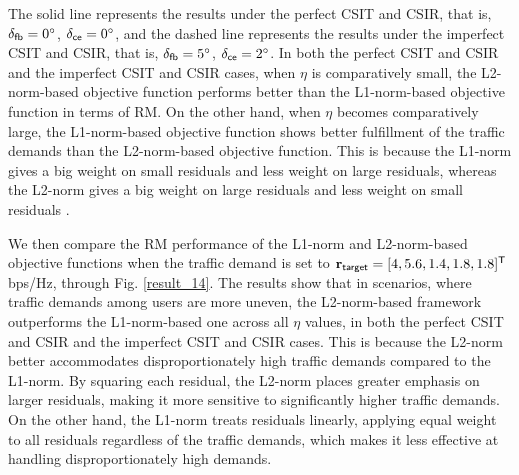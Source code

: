 \documentclass[draftclsnofoot, onecolumn, comsoc, 12pt]{IEEEtran}
\begin{document}
The solid line represents the results under the perfect CSIT and CSIR, that is, $\delta_{\sf{fb}} = 0^{\circ}$, $\delta_{\sf{ce}} = 0^{\circ}$, and the dashed line represents the results under the imperfect CSIT and CSIR, that is, $\delta_{\sf{fb}} = 5^{\circ}$, $\delta_{\sf{ce}} = 2^{\circ}$. In both the perfect CSIT and CSIR and the imperfect CSIT and CSIR cases, when $\eta$ is comparatively small, the L2-norm-based objective function performs better than the L1-norm-based objective function in terms of RM.
On the other hand, when $\eta$ becomes comparatively large, the L1-norm-based objective function shows better fulfillment of the traffic demands than the L2-norm-based objective function.
{This is because the L1-norm gives a big weight on small residuals and less weight on large residuals, whereas the L2-norm gives a big weight on large residuals and less weight on small residuals \cite{boyd2004convex}.}

{ We then compare the RM performance of the L1-norm and L2-norm-based objective functions when the traffic demand is set to $\mathbf{r}_{\sf{target}} = [4, 5.6, 1.4, 1.8, 1.8]^{\sf{T}}$ bps/Hz, through Fig. \ref{result_14}. The results show that in scenarios, where traffic demands among users are more uneven, the L2-norm-based framework outperforms the L1-norm-based one across all $\eta$ values, in both the perfect CSIT and CSIR and the imperfect CSIT and CSIR cases. This is because the L2-norm better accommodates disproportionately high traffic demands compared to the L1-norm. By squaring each residual, the L2-norm places greater emphasis on larger residuals, making it more sensitive to significantly higher traffic demands. On the other hand, the L1-norm treats residuals linearly, applying equal weight to all residuals regardless of the traffic demands, which makes it less effective at handling disproportionately high demands.}




\end{document}
